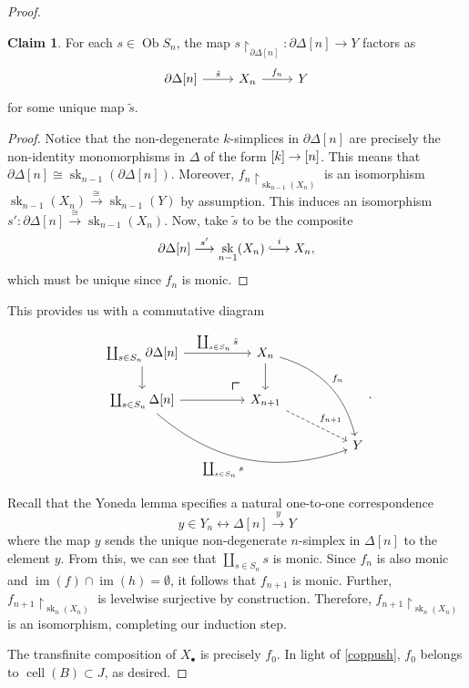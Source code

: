 \documentclass[10pt,letterpaper,cm]{nupset}
\theoremstyle{definition}
\theoremstyle{theorem}
\newtheorem*{claim}{Claim}
\theoremstyle{remark}
\newcommand{\hooklongrightarrow}{\lhook\joinrel\longrightarrow}
\DeclareMathOperator{\im}{im}
\DeclareMathOperator{\ob}{Ob}
\newcommand{\0}{\mathbf{0}}
\newcommand{\1}{\mathbf{1}}
\newcommand{\2}{\mathbf{2}}
\DeclareMathOperator{\sk}{sk}
\DeclareMathOperator{\cell}{cell}
\begin{document}
\begin{proof}
\begin{claim}
For each $s\in \ob{S_n}$, the map $s\restriction_{\partial{\Delta[n]}} : \partial{\Delta[n]} \to Y$ factors as
\[
\begin{tikzcd}
{\partial{\Delta[n]}} \arrow[r, "\tilde{s}"] & X_n \arrow[r, "f_n"] & Y
\end{tikzcd}
\] for some unique map $\tilde{s}$.
\end{claim}
\begin{proof}
 Notice that the non-degenerate $k$-simplices in $\partial{\Delta[n]}$ are precisely the non-identity monomorphisms in $\varDelta$ of the form $\mleft[k\mright] \to \mleft[n\mright]$. This means that  $\partial{\Delta[n]} \cong \sk_{n-1}(\partial{\Delta[n]})$. Moreover, $f_n\restriction_{\sk_{n-1}(X_n)}$ is an isomorphism $\sk_{n-1}(X_n) \overset{\cong}{\longrightarrow} \sk_{n-1}(Y)$ by assumption. This induces an isomorphism $s' : \partial{\Delta[n]} \overset{\cong}{\longrightarrow} \sk_{n-1}(X_n)$. Now, take $\tilde{s}$ to be the composite
\[  
\partial{\Delta[n]} \overset{s'}{\longrightarrow} \sk_{n-1}(X_n)  \overset{i}{\hooklongrightarrow} X_n,
\] which must be unique since $f_n$ is monic.
\end{proof}

This provides us with a commutative diagram

\[
\begin{tikzcd}[column sep=huge]
{\coprod_{s\in S_n}\partial{\Delta[n]}} \arrow[d] \arrow[r, "\coprod_{s\in S_n}\tilde{s}"] 
 \arrow[dr, phantom, "\scalebox{1.5}{\color{black}$\ulcorner$}", very near end, color=black]
 & X_n \arrow[d] \arrow[rdd, "f_n", bend left] &   \\
{\coprod_{s\in S_n}\Delta[n]} \arrow[r] \arrow[rrd, "\coprod_{s\in S_n}{s}"', bend right]         & X_{n+1} \arrow[rd, "f_{n+1}", dashed]       &   \\
                                                                                                  &                                             & Y
\end{tikzcd}.
\]

Recall that the Yoneda lemma specifies a natural one-to-one correspondence 
\[
y\in Y_n \longleftrightarrow \Delta[n] \overset{y}{\to} Y
\] where the map $y$ sends the unique non-degenerate $n$-simplex in $\Delta[n]$ to the element $y$. From this, we can see that $\coprod_{s\in S_n}{s}$ is monic. Since $f_n$ is also monic and $\im(f) \cap \im(h) = \emptyset$, it follows that $f_{n+1}$ is monic. Further, $f_{n+1}\restriction_{\sk_n(X_{n})}$ is levelwise surjective by construction. Therefore, $f_{n+1}\restriction_{\sk_n(X_{n})}$ is an isomorphism, completing our induction step.

\smallskip

The transfinite composition of $X_{\bullet}$ is precisely $f_0$. In light of \cref{coppush}, $f_0$ belongs to $\cell(B) \subset J$, as desired.
\end{proof}
\end{document}
